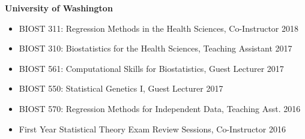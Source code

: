 \documentclass[margin]{res}
\begin{document}
\begin{resume}
\newpage
\textbf{University of Washington}
\begin{itemize}
\item BIOST 311: Regression Methods in the Health Sciences, Co-Instructor \hfill  2018 
\item BIOST 310: Biostatistics for the Health Sciences, Teaching Assistant  \hfill 2017 
\item BIOST 561: Computational Skills for Biostatistics, Guest Lecturer \hfill 2017
\item BIOST 550: Statistical Genetics I, Guest Lecturer  \hfill 2017 
\item BIOST 570: Regression Methods for Independent Data, Teaching Asst.  \hfill 2016 
\item First Year Statistical Theory Exam Review Sessions, Co-Instructor  \hfill 2016 
\end{itemize}



\end{resume}
\end{document}
